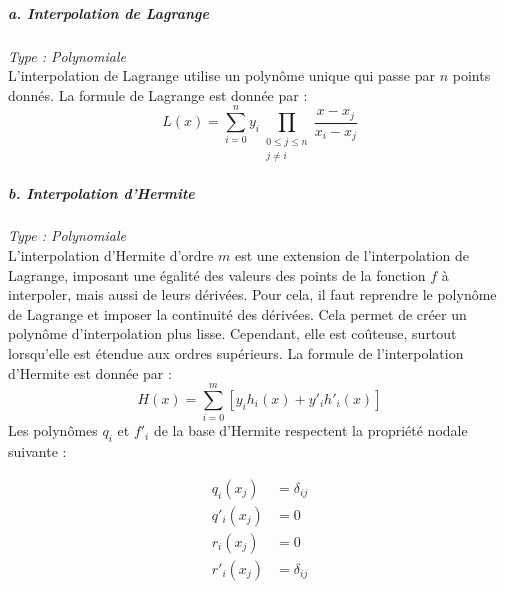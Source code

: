 \subparagraph{a. Interpolation de Lagrange \cite{Barycentric_Lagrange1, Barycentric_Lagrange2}}
\textit{Type : Polynomiale} \\
\phantom{----}L'interpolation de Lagrange utilise un polynôme unique qui passe par \(n\) points donnés. La formule de Lagrange est donnée par :
\begin{equation}
    L(x) = \sum_{i=0}^{n} y_i \prod_{\substack{0 \leq j \leq n \\ j \neq i}} \frac{x - x_j}{x_i - x_j}
\end{equation}
\subparagraph{b. Interpolation d'Hermite \cite{bajaj}}
\textit{Type : Polynomiale} \\
\phantom{----}L'interpolation d'Hermite d'ordre \(m\) est une extension de l'interpolation de Lagrange, imposant une égalité des valeurs des points de la fonction \(f\) à interpoler, mais aussi de leurs dérivées. Pour cela, il faut reprendre le polynôme de Lagrange et imposer la continuité des dérivées. Cela permet de créer un polynôme d'interpolation plus lisse. Cependant, elle est coûteuse, surtout lorsqu'elle est étendue aux ordres supérieurs. La formule de l'interpolation d'Hermite est donnée par :
\begin{equation}
    H(x) = \sum_{i=0}^{m} \left[ y_i h_i(x) + y'_i h'_i(x) \right]
\end{equation}
\vspace{-0,2 cm}
Les polynômes \( q_i \) et \( f'_i \) de la base d'Hermite respectent la propriété nodale suivante :

\vspace{-0,2 cm}

\begin{equation}
    \begin{aligned}
        q_i(x_j) &= \delta_{ij} \\
        q'_i(x_j) &= 0 \\
        r_i(x_j) &= 0 \\
        r'_i(x_j) &= \delta_{ij}
    \end{aligned}
\end{equation}

